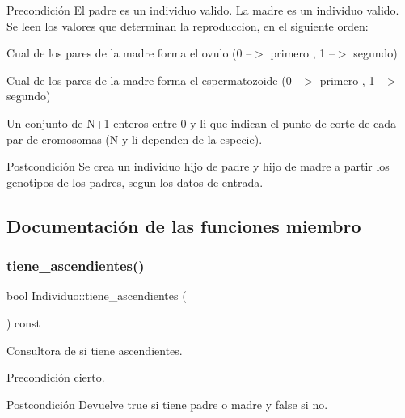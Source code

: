\begin{DoxyPrecond}{Precondición}
El padre es un individuo valido. La madre es un individuo valido. Se leen los valores que determinan la reproduccion, en el siguiente orden\+:
\begin{DoxyEnumerate}
\item Cual de los pares de la madre forma el ovulo (\textquotesingle{}0\textquotesingle{} --$>$ primero , \textquotesingle{}1\textquotesingle{} --$>$ segundo)
\item Cual de los pares de la madre forma el espermatozoide (\textquotesingle{}0\textquotesingle{} --$>$ primero , \textquotesingle{}1\textquotesingle{} --$>$ segundo)
\item Un conjunto de N+1 enteros entre 0 y li que indican el punto de corte de cada par de cromosomas (N y li dependen de la especie).
\end{DoxyEnumerate}
\end{DoxyPrecond}
\begin{DoxyPostcond}{Postcondición}
Se crea un individuo hijo de padre y hijo de madre a partir los genotipos de los padres, segun los datos de entrada. 
\end{DoxyPostcond}


\subsection{Documentación de las funciones miembro}
\mbox{\label{class_individuo_a35c602df3c6e1f186b7494513208b716}} 
\subsubsection{\texorpdfstring{tiene\+\_\+ascendientes()}{tiene\_ascendientes()}}
{\footnotesize\ttfamily bool Individuo\+::tiene\+\_\+ascendientes (\begin{DoxyParamCaption}{ }\end{DoxyParamCaption}) const}



Consultora de si tiene ascendientes. 

\begin{DoxyPrecond}{Precondición}
cierto. 
\end{DoxyPrecond}
\begin{DoxyPostcond}{Postcondición}
Devuelve true si tiene padre o madre y false si no. 
\end{DoxyPostcond}
\mbox{\label{class_individuo_a27159ca95f0e9d8b14685dfa40f4e563}} 
